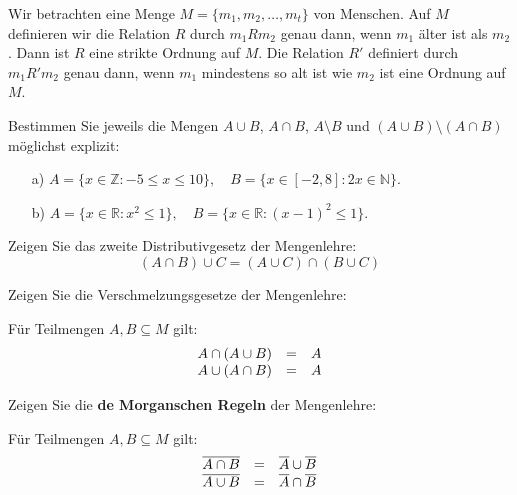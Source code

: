 \begin{beispiel} Wir betrachten eine Menge $M = \{m_1, m_2, \ldots , m_t\}$ von Menschen. Auf $M$ definieren wir die 
Relation $R$ durch $m_1Rm_2$ genau dann, wenn $m_1$ älter ist als $m_2$. Dann ist $R$ eine strikte Ordnung 
auf $M$. Die Relation $R'$ definiert durch $m_1 R' m_2$ genau dann, wenn $m_1$ mindestens so alt ist wie 
$m_2$ ist eine Ordnung auf $M$.
\end{beispiel}

\bigbreak

\begin{aufgabe} Bestimmen Sie jeweils die Mengen $A \cup B$, $A \cap B$, 
$A \setminus B$ und $(A \cup B) \setminus (A \cap B)$ möglichst explizit:
\begin{itemize}
\item[a)] $A = \{ x \in \mathbb Z: -5 \leq x \leq 10 \}, \quad  B = \{ x \in [-2,8]:
2x \in \mathbb N \}$.
\item[b)] $A = \{x \in \mathbb R: x^2 \leq 1 \}, \quad B = \{ x \in \mathbb R: (x - 1)^2 
\leq 1 \}$.
\end{itemize}
\end{aufgabe}

\begin{aufgabe}\label{mengen_aufg_distr} Zeigen Sie das zweite Distributivgesetz der Mengenlehre:
 $$(A \cap B) \cup C = (A \cup C) \cap (B \cup C)$$
\end{aufgabe}

\begin{aufgabe}\label{mengen_aufg_verschm} Zeigen Sie die Verschmelzungsgesetze der Mengenlehre:

Für Teilmengen $A, B \subseteq M$ gilt:
 	$$ \begin{array} {l c l}
  	A \cap (A \cup B) & = & A  \\
  	A \cup (A \cap B) & = & A 
 	\end{array} $$
\end{aufgabe}

\begin{aufgabe}\label{mengen_de_morgan} Zeigen Sie die \textbf{de Morganschen Regeln} der Mengenlehre:

Für Teilmengen $A, B \subseteq M$ gilt:
  	$$ \begin{array} {l c l}
   	\overline{A \cap B} & = & \overline{A} \cup \overline{B} \\
   	\overline{A \cup B} & = & \overline{A} \cap \overline{B}
  	\end{array} $$
\end{aufgabe}

